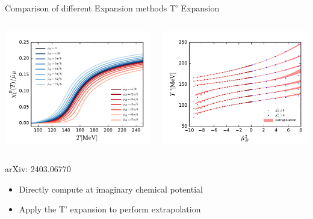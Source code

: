 \begin{frame}[fragile]{Comparison of different Expansion methods}
    \centering
    T' Expansion
    \vspace{-0.1cm}
    \begin{columns}
        \begin{column}{0.5\textwidth}
            \includegraphics[width=0.9\linewidth]{Images/Figures/chi1_mub.pdf}
        \end{column}
        \begin{column}{0.5\textwidth}
            \includegraphics[width=0.9\linewidth]{Images/Figures/Ext.pdf}
        \end{column}
    \end{columns}
    {\centering \scriptsize arXiv: 2403.06770 \par}
    \begin{itemize}
    \item Directly compute at imaginary chemical potential 
    \item Apply the T’ expansion to perform extrapolation
    \end{itemize} 
\end{frame}
